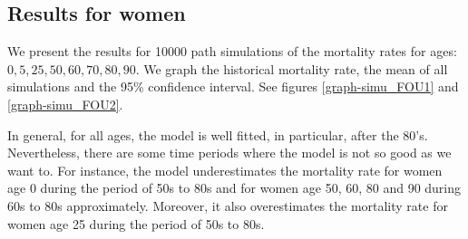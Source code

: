 \documentclass[smallextended]{svjour3}
\begin{document}
    \subsection{Results for women}
    \label{re-wom}

        We present the results for \num{10000} path simulations of the 
    mortality rates for ages: 
    $
        \num{0}, \num{5}, \num{25}, 
        \num{50},\num{60}, \num{70}, 
        \num{80},\num{90}
    $.
        We graph the historical mortality rate, the mean of all simulations and 
    the \num{95}\% confidence interval. See figures \ref{graph-simu_FOU1} and
    \ref{graph-simu_FOU2}.

        In general, for all ages, the model is well fitted, in particular,
    after the \num{80}'s. Nevertheless, there are some time periods where the 
    model is not so good as we want to. For instance, the model underestimates 
    the mortality rate for women age \num{0} during the period of 
    \num{50}s to \num{80}s and for women age \num{50}, \num{60},
    \num{80} and \num{90} during \num{60}s to \num{80}s approximately. 
    Moreover, it also overestimates the mortality rate for
    women age \num{25} during the period of \num{50}s to \num{80}s.
\end{document}
